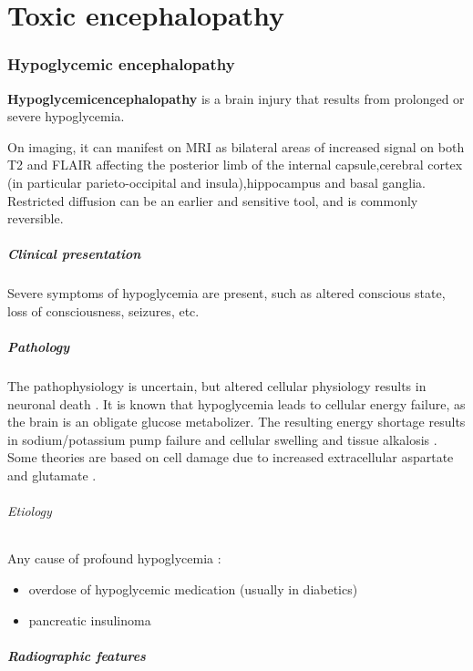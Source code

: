 \chapter{Toxic encephalopathy}

\subsection{Hypoglycemic encephalopathy}

\textbf{Hypoglycemicencephalopathy} is a brain injury that results from prolonged or severe hypoglycemia.

On imaging, it can manifest on MRI as bilateral areas of increased signal on both T2 and FLAIR affecting the posterior limb of the internal capsule,cerebral cortex (in particular parieto-occipital and insula),hippocampus and basal ganglia. Restricted diffusion can be an earlier and sensitive tool, and is commonly reversible.

\paragraph{Clinical presentation}

Severe symptoms of hypoglycemia are present, such as altered conscious state, loss of consciousness, seizures, etc.

\paragraph{Pathology}

The pathophysiology is uncertain, but altered cellular physiology results in neuronal death . It is known that hypoglycemia leads to cellular energy failure, as the brain is an obligate glucose metabolizer. The resulting energy shortage results in sodium/potassium pump failure and cellular swelling and tissue alkalosis . Some theories are based on cell damage due to increased extracellular aspartate and glutamate .

\subparagraph{Etiology}

Any cause of profound hypoglycemia :

\begin{itemize}
	\item
	overdose of hypoglycemic medication (usually in diabetics)
	\item
	pancreatic insulinoma
\end{itemize}

\paragraph{Radiographic features}

